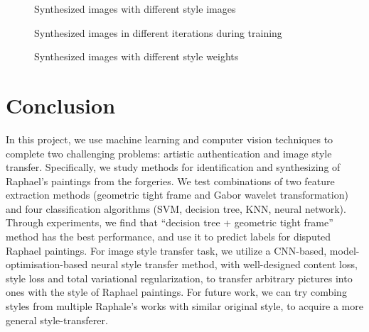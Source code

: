 \documentclass{article}
\begin{document}
\begin{figure}[htbp]
\centering
{}
\quad
{}
\caption{Synthesized images with different style images}
\label{fig:style-style}
\end{figure}

\begin{figure}[htbp]
\centering
{}
\quad
{}
\quad
{}
\quad
{}
\quad
{}
\quad
{}
\caption{Synthesized images in different iterations during training}
\label{fig:style-train}
\end{figure}

\begin{figure}[htbp]
\centering
{}
\quad
{}
\quad
{}
\quad
{}
\caption{Synthesized images with different style weights}
\label{fig:style-weight}
\end{figure}

\section{Conclusion}

In this project, we use machine learning and computer vision techniques to complete two challenging problems: artistic authentication and image style transfer. Specifically, we study methods for identification and synthesizing of Raphael’s paintings from the forgeries.
We test combinations of two feature extraction methods (geometric tight frame and Gabor wavelet transformation) and four classification algorithms (SVM, decision tree, KNN, neural network). Through experiments, we find that ``decision tree + geometric tight frame'' method has the best performance, and use it to predict labels for disputed Raphael paintings. 
For image style transfer task, we utilize a CNN-based, model-optimisation-based neural style transfer method, with well-designed content loss, style loss and total variational regularization, to transfer arbitrary pictures into ones with the style of Raphael paintings. For future work, we can try combing styles from multiple Raphale's works with similar original style, to acquire a more general style-transferer.
\end{document}

